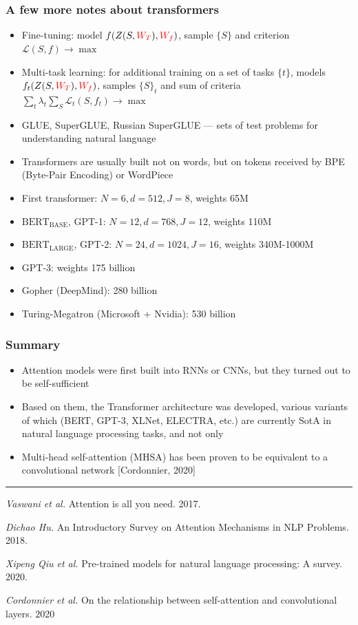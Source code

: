\documentclass[fullscreen=true, bookmarks=true, hyperref={pdfencoding=unicode}]{beamer}
\begin{document}
\begin{frame}
  \frametitle{A few more notes about transformers}

  \begin{itemize}
    \item Fine-tuning: model $f(Z(S, {\color{red}W_T}), {\color{red}W_f})$, sample $\{S\}$ and criterion $\mathcal{L}(S, f) \to \max$
    \item Multi-task learning: for additional training on a set of tasks $\{t\}$, models $f_t(Z(S, {\color{red}W_T}), {\color{red}W_f})$, samples $\{S\}_t$ and sum of criteria $ \sum_t \lambda_t \sum_S \mathcal{L}_t(S, f_t) \to \max $
    \item GLUE, SuperGLUE, Russian SuperGLUE — sets of test problems for understanding natural language
    \item Transformers are usually built not on words, but on tokens received by BPE (Byte-Pair Encoding) or WordPiece
    \pause
    \item First transformer: $N = 6, d = 512, J = 8$, weights 65M
    \item $\text{BERT}_{\text{BASE}}$, GPT-1: $N = 12, d = 768, J = 12$, weights 110M
    \item $\text{BERT}_{\text{LARGE}}$, GPT-2: $N = 24, d = 1024, J = 16$, weights 340M-1000M
    \pause
    \item GPT-3: weights 175 billion
    \item Gopher (DeepMind): 280 billion
    \item Turing-Megatron (Microsoft + Nvidia): 530 billion
  \end{itemize}
\end{frame}


\begin{frame}
  \frametitle{Summary}
  \begin{itemize}
    \item Attention models were first built into RNNs or CNNs, but they turned out to be self-sufficient
    \item Based on them, the Transformer architecture was developed, various variants of which (BERT, GPT-3, XLNet, ELECTRA, etc.) are currently SotA in natural language processing tasks, and not only
    \item Multi-head self-attention (MHSA) has been proven to be equivalent to a convolutional network [Cordonnier, 2020]
  \end{itemize}

  \noindent\rule{8cm}{0.4pt}

  {\footnotesize
  {\it Vaswani et al.} Attention is all you need. 2017.

  {\it Dichao Hu.} An Introductory Survey on Attention Mechanisms in NLP Problems. 2018.

  {\it Xipeng Qiu et al.} Pre-trained models for natural language processing: A survey. 2020.

  {\it Cordonnier et al.} On the relationship between self-attention and convolutional layers. 2020}
\end{frame}
\end{document}
